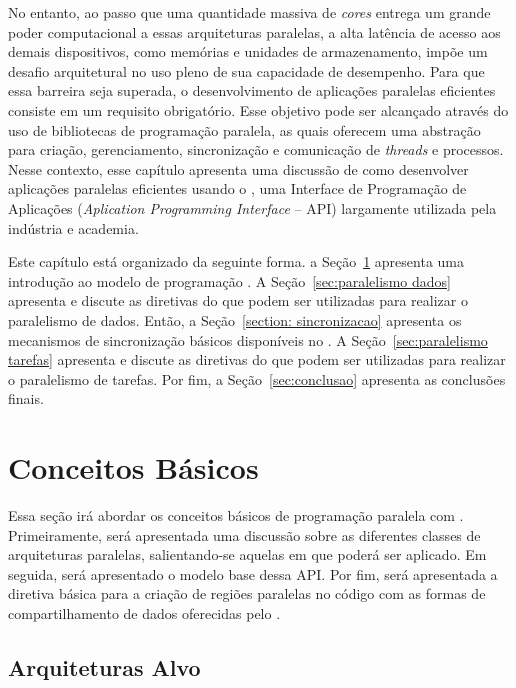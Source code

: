 \documentclass{SBCbookchapter}
\begin{document}
	No entanto, ao passo que uma quantidade massiva de \textit{cores}
	entrega um grande poder computacional a essas arquiteturas
	paralelas, a alta latência de acesso aos demais dispositivos, como
	memórias e unidades de armazenamento, impõe um desafio arquitetural
	no uso pleno de sua capacidade de desempenho. Para que essa barreira
	seja superada, o desenvolvimento de aplicações paralelas eficientes
	consiste em um requisito obrigatório. Esse objetivo pode ser
	alcançado através do uso de bibliotecas de programação paralela, as
	quais oferecem uma abstração para criação, gerenciamento,
	sincronização e comunicação de \textit{threads} e processos. Nesse
	contexto, esse capítulo apresenta uma discussão de como desenvolver
	aplicações paralelas eficientes usando o \openmp, uma Interface de
	Programação de Aplicações (\textit{Aplication Programming Interface}
	-- API) largamente utilizada pela indústria e academia. 
	
	Este capítulo está organizado da seguinte forma. a
	Seção~\ref{sec:conceitos basicos} apresenta uma introdução ao modelo
	de programação \openmp.  A Seção~\ref{sec:paralelismo dados}
	apresenta e discute as diretivas do \openmp que podem ser utilizadas
	para realizar o paralelismo de dados.  Então, a Seção~\ref{section:
	sincronizacao} apresenta os mecanismos de sincronização básicos
	disponíveis no \openmp. A Seção~\ref{sec:paralelismo tarefas}
	apresenta e discute as diretivas do \openmp que podem ser utilizadas
	para realizar o paralelismo de tarefas. Por fim, a
	Seção~\ref{sec:conclusao} apresenta as conclusões finais.

\section{Conceitos Básicos}
\label{sec:conceitos basicos}

	Essa seção irá abordar os conceitos básicos de programação paralela com
	\openmp. Primeiramente, será apresentada uma discussão sobre as diferentes
	classes de arquiteturas paralelas, salientando-se aquelas em que \openmp
	poderá ser aplicado.	Em seguida, será apresentado o modelo base dessa API.
	Por fim, será apresentada a diretiva básica para a criação de regiões paralelas
	no código com as formas de compartilhamento de dados oferecidas pelo \openmp.

	\subsection{Arquiteturas Alvo}
\end{document}
